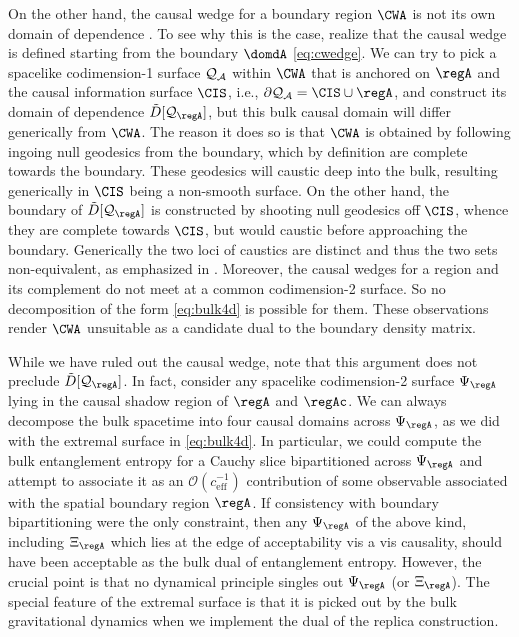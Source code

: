 \documentclass[12pt,openany]{book}
\begin{document}
 On the other hand, the causal wedge for a boundary region $\CWA$ is not its own domain of dependence \cite{Hubeny:2014qwa}. To see why this is the case, realize that the causal wedge is defined starting from the boundary $\domdA$ \eqref{eq:cwedge}. We can try to pick a spacelike codimension-1 surface ${\cal Q}_{\cal A}$  within $\CWA$ that is anchored on $\regA$ and the causal information surface $\CIS$,  i.e., $\partial {\cal Q}_{\cal A}  = \CIS \cup \regA$,
 and construct its domain of dependence $\tilde{D}[{\cal Q}_\regA]$, but this bulk causal domain will differ generically from $\CWA$. The reason it does so is that $\CWA$ is obtained by following ingoing null geodesics from the boundary, which by definition are complete towards the boundary. These geodesics will caustic deep into the bulk, resulting generically in $\CIS$ being a non-smooth surface.  On the other hand, the boundary of $\tilde{D}[{\cal Q}_\regA]$ is constructed by shooting null geodesics off $\CIS$, whence they are complete towards $\CIS$, but would caustic before approaching the boundary. Generically the two loci of caustics are distinct and thus the two sets non-equivalent, as emphasized in \cite{Hubeny:2014qwa}. Moreover, the causal wedges for a region and its complement do not meet at a common codimension-2 surface. So no decomposition of the form \eqref{eq:bulk4d} is possible for them.  These observations render $\CWA$ unsuitable as a candidate dual to the boundary density matrix.

 While we have ruled out the causal wedge, note that this argument does not preclude $\tilde{D}[{\cal Q}_\regA]$. In fact,  consider any spacelike codimension-2 surface $\Psi_\regA$ lying in the causal shadow region of  $\regA$ and $\regAc$. We can always decompose the bulk spacetime into four causal domains across $\Psi_\regA$, as we did with the extremal surface in \eqref{eq:bulk4d}. In particular, we could compute the bulk entanglement entropy for a Cauchy slice bipartitioned across $\Psi_\regA$ and attempt to associate it as an
 $\mathcal{O}(c_\text{eff}^{-1})$ contribution of some observable associated with the spatial boundary region $\regA$. If consistency with boundary bipartitioning were the only constraint, then any $\Psi_\regA$ of the above kind, including $\Xi_\regA$  which  lies at the edge of acceptability vis a vis causality, should have been acceptable as the bulk dual of entanglement entropy. However, the crucial point is that no dynamical principle singles out $\Psi_\regA$ (or $\Xi_\regA$).  The special feature of the extremal surface is that it is picked out by the bulk gravitational dynamics when we implement the dual of the replica construction.
\end{document}
